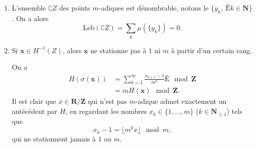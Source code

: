 \documentclass[a4paper,12pt,openany]{article}
\theoremstyle{plain}
\theoremstyle{definition}
\newcommand{\R}{\mathbf{R}}
\newcommand{\Z}{\mathbf{Z}}
\newcommand{\N}{\mathbf{N}}
\begin{document}
\begin{enumerate}
\item  L'ensemble $\complement Z$ des points $m$-adiques est d\'enombrable, notons le $\{y_k,~Êk\in\N\}$. On a alors
$$
\mathrm{Leb}\left(\complement Z\right) = \sum_{k} \mu(\{y_k\}) = 0.
$$

\item Si $\mathbf{x} \in H^{-1}(Z)$, alors $\mathbf{x}$ ne stationne pas \`a $1$ ni $m$ \`a partir d'un certain rang.


On a
$$
\begin{aligned}
H(\sigma(\mathbf{x})) &= \sum_{k=1}^\infty \frac{x_{k+1} - 1}{m^k}Ê\mod \Z \\
&= m H(\mathbf{x}) \mod \Z.
\end{aligned}
$$
Il est clair que $x \in \R/\Z$ qui n'est pas $m$-adique admet exactement un ant\'ec\'edent par $H$, en regardant les nombres $x_k \in \{1, \dots, m\}$ ($k \in \N_{\geqslant 1}$) tels que
$$
x_k - 1 = \lfloor m^{k} x \rfloor \mod m,
$$
qui ne stationnent jamais \`a $1$ ou $m$.
\end{enumerate}
\end{document}
